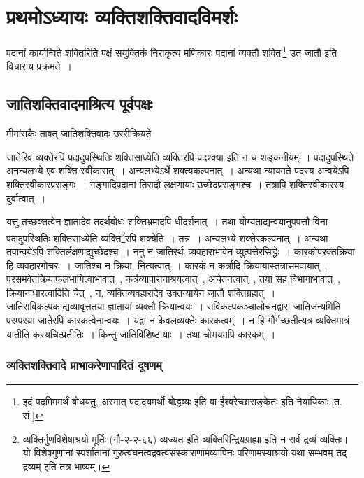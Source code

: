 \chapter{प्रथमोऽध्यायः  व्यक्तिशक्तिवादविमर्शः}

	पदानां कार्यान्विते शक्तिरिति पक्षं सयुक्तिकं निराकृत्य मणिकारः पदानां व्यक्तौ शक्तिः\footnote{इदं पदमिममर्थं बोधयतु, अस्मात् पदादयमर्थो बोद्धव्यः इति वा ईश्वरेच्छासङ्केतः इति नैयायिकाः,[त. सं.]} उत जातौ इति विचाराय प्रक्रमते~।

	\section{जातिशक्तिवादमाश्रित्य पूर्वपक्षः}

		मीमांसकैः तावत् जातिशक्तिवादः उररीक्रियते
		
		जातेरिव व्यक्तेरपि पदादुपस्थितिः शक्तिसाध्येति व्यक्तिरपि पदश्क्या इति न च शङ्कनीयम्~। पदादुपस्थिते अनन्यलभ्ये एव शक्ति स्वीकारात्~। अन्यलभ्येऽर्थे शक्त्यकल्पनात्~। अन्यथा न्यायमते पदस्य अन्वयेऽपि शक्तिस्वीकारप्रसङ्गः~। गङ्गादिपदानां तिरादौ लक्षणायाः उच्छेदप्रसङ्गश्च~। तत्रापि शक्तिस्वीकारस्य दुर्वात्वात्~।	
		
		\begin{small}
	
			यत्तु तच्छक्तत्वेन ज्ञातादेव तदर्थबोधः शक्तिभ्रमादपि धीदर्शनात्~। तथा योग्यताद्यन्वयानुपपत्तौ विना पदादुपस्थितिः शक्तिसाध्येति व्यक्ति\footnote{व्यक्तिर्गुणविशेषाश्रयो मूर्तिः (गौ-२-२-६६) व्यज्यत इति व्यक्तिरिन्द्रियग्राह्या इति न सर्वं द्रव्यं व्यक्तिः। यो विशेषगुणानां स्पर्शांतानां गुरुत्वघनत्वद्रवत्वसंस्काराणामव्यापिनः परिणामस्याश्रयो यथा सम्भवम् तद् द्रव्यम् इति तत्र भाष्यम्।}रपि शक्येति~। तन्न~। अन्यलभ्ये शक्तेरकल्पनात्~। अन्यथा तवान्वयेऽपि शक्तिर्लक्षणाद्युच्छेदश्च~। ननु न जातिरर्थः व्यवहाराभावेन व्युत्पत्तेरसिद्धेः~। कारकोपरक्तक्रिया हि व्यवहारगोचरः~। जातिश्च न क्रिया, नित्यत्वात्~। कारकं न कर्त्रादि क्रियायास्तत्रासमवायात्~, परसमवेतक्रियाफलभागित्वाभावात्~, कर्त्रव्यापारानाश्रयत्वात्~, अचेतनत्वात्~, तया सह विभागाभावात्~, क्रियानाधारत्वादिति चेत्~, न, व्यक्तिव्यवहारादेव उक्तन्यायेन जातौ शक्तिग्रहात्~। जातिसविकल्पकाद्यव्यावृत्ततया ज्ञातायां व्यक्तौ क्रियान्वयः~। सविकल्पकञ्चालोचनद्वारा जातिजन्यमिति परम्परया जातेरपि कारकत्वेनान्वयः~। यद्वा न केवलव्यक्तेः कारकत्वम्~। न हि गौर्गच्छतीत्यत्र व्यक्तिमात्रं यातीति कस्यचित्प्रतीतिः~। किन्तु जातिविशिष्टायाः~। तथा चोभयमपि कारकम्~।
		\end{small}	
		
			\subsection{व्यक्तिशक्तिवादे प्राभाकरेणापादितं दूषणम् }
			
